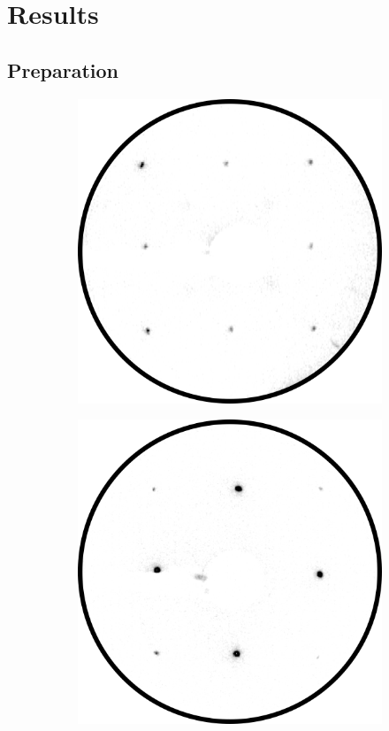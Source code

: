 \chapter{Results}

\section{Preparation}
\begin{figure}[h]
    \centering
    \begin{subfigure}{0.25\textwidth}
        \includegraphics[width = \textwidth]{Plots/Fe.png}
        \caption{}
        \label{fig:leed_Fe}
    \end{subfigure}
    \hfill
    \begin{subfigure}{0.25\textwidth}
        \includegraphics[width = \textwidth]{Plots/FeO.png}

\end{subfigure}
\end{figure}
